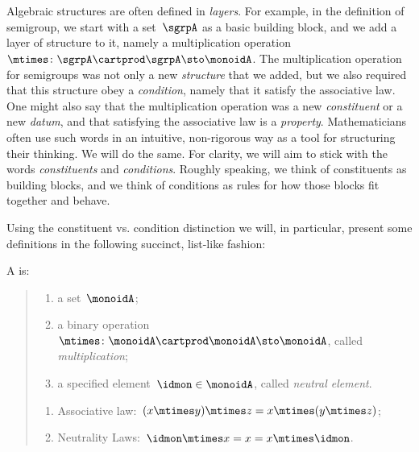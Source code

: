 

\section{}
\label{sec:parallelism-monoids}


Algebraic structures are often defined in \emph{layers}.
For example, in the definition of semigroup, we start with a set~$\sgrpA$ as a basic building block, and we add a layer of structure to it, namely a multiplication operation~$\mtimes \colon \sgrpA \cartprod \sgrpA \sto \monoidA$.
The multiplication operation for semigroups was not only a new \emph{structure} that we added, but we also required that this structure obey a \emph{condition}, namely that it satisfy the associative law.
One might also say that the multiplication operation was a new \emph{constituent} or a new \emph{datum}, and that satisfying the associative law is a \emph{property}.
Mathematicians often use such words in an intuitive, non-rigorous way as a tool for structuring their thinking.
We will do the same. For clarity, we will aim to stick with the words \emph{constituents} and \emph{conditions}.
Roughly speaking, we think of constituents as building blocks, and we think of conditions as rules for how those blocks fit together and behave.

Using the constituent vs. condition distinction we will, in particular, present some definitions in the following succinct, list-like fashion:

\begin{definition}[Monoid]
  \label{def:monoid}
  A \emph{} is:
  \begin{quote}
    \constit
    \begin{enumerate}
      \item a set~$\monoidA$;
      \item a binary operation~$\mtimes \colon \monoidA \cartprod \monoidA \sto \monoidA$, called \emph{multiplication};
      \item a specified element~$\idmon\in \monoidA$, called \emph{neutral element}.
    \end{enumerate}
    \condit
    \begin{enumerate}
      \item Associative law:~$(x\mtimes y)\mtimes z=x\mtimes (y\mtimes z)$;
      \item Neutrality Laws:~$\idmon\mtimes x=x=x\mtimes \idmon$.
    \end{enumerate}
  \end{quote}
\end{definition}


